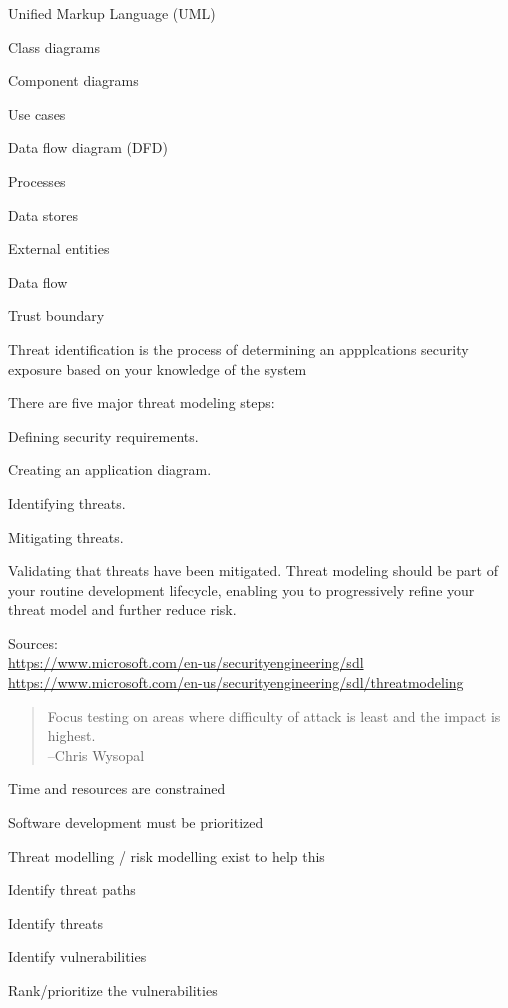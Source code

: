 \documentclass[Screen16to9,17pt]{foils}
\begin{document}

\begin{list2}
\item Unified Markup Language (UML)
\item Class diagrams
\item Component diagrams
\item Use cases
\item Data flow diagram (DFD)
\item Processes
\item Data stores
\item External entities
\item Data flow
\item Trust boundary
\item Threat identification is the process of determining an appplcations security exposure based on your knowledge of the system
\end{list2}



There are five major threat modeling steps:
\begin{list2}
\item Defining security requirements.
\item Creating an application diagram.
\item Identifying threats.
\item Mitigating threats.
\item Validating that threats have been mitigated.
Threat modeling should be part of your routine development lifecycle, enabling you to progressively refine your threat model and further reduce risk.
\end{list2}

Sources:\\
\url{https://www.microsoft.com/en-us/securityengineering/sdl}\\
\url{https://www.microsoft.com/en-us/securityengineering/sdl/threatmodeling}


\begin{quote}
Focus testing on areas where difficulty of attack is least and the impact is highest.\\
  --Chris Wysopal
\end{quote}

\begin{list1}
\item Time and resources are constrained
\item Software development must be prioritized
\item Threat modelling / risk modelling exist to help this
\begin{list2}
\item Identify threat paths
\item Identify threats
\item Identify vulnerabilities
\item Rank/prioritize the vulnerabilities
\end{list2}
\end{list1}
\end{document}
